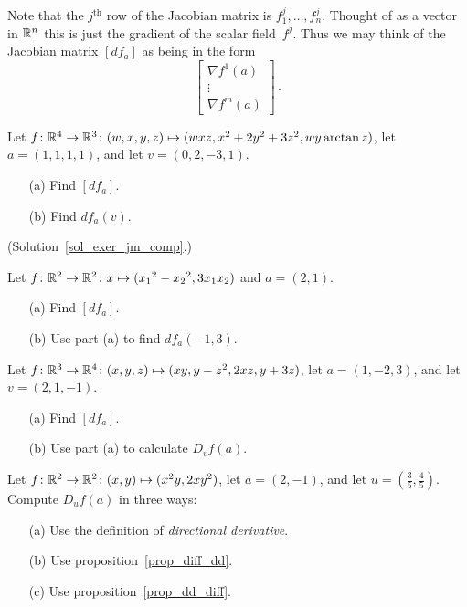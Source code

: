 Note that the $j^{\text{th}}$ row of the Jacobian matrix is $f_1^j, \dots, f_n^j$.  Thought of
as a vector in $\mathbb{R}^n$ this is just the gradient of the scalar field~$f^j$.  Thus we may think
of the Jacobian matrix $[df_a]$ as being in the form
  \[ \begin{bmatrix}   \nabla f^1(a)  \\
                         \vdots       \\
                       \nabla f^m(a)
     \end{bmatrix}\,. \]

\begin{exer}\label{exer_jm_comp}  Let $f\colon \mathbb{R}^4 \rightarrow \mathbb{R}^3\colon  (w,x,y,z) \mapsto
(wxz, x^2 + 2y^2 + 3z^2, wy\arctan z)$, let $a = (1,1,1,1)$, and let $v = (0,2,-3,1)$.
 \begin{enumerate}
  \item[(a)] Find $[df_a]$.
  \item[(b)] Find $df_a(v)$.
 \end{enumerate}
(Solution~\ref{sol_exer_jm_comp}.)
\end{exer}

\begin{prob} Let $f \colon \mathbb{R}^2 \rightarrow \mathbb{R}^2\colon  x \mapsto ({x_1}^2 - {x_2}^2, 3x_1x_2)$ and
$a = (2,1)$.
 \begin{enumerate}
  \item[(a)] Find $[df_a]$.
  \item[(b)] Use part (a) to find $df_a(-1,3)$.
 \end{enumerate}
\end{prob}

\begin{prob}  Let $f \colon \mathbb{R}^3 \rightarrow \mathbb{R}^4 \colon (x,y,z) \mapsto (xy, y - z^2, 2xz, y + 3z)$,
let $a = (1,-2,3)$, and let $v = (2,1,-1)$.
 \begin{enumerate}
  \item[(a)] Find $[df_a]$.
  \item[(b)] Use part (a) to calculate $D_vf(a)$.
 \end{enumerate}
\end{prob}

\begin{prob}  Let $f \colon \mathbb{R}^2 \rightarrow \mathbb{R}^2 \colon (x,y) \mapsto (x^2y, 2xy^2)$, let $a = (2,-1)$,
and let $u = (\frac35, \frac45)$.  Compute $D_uf(a)$ in three ways:
 \begin{enumerate}
  \item[(a)] Use the definition of \emph{directional derivative}.
  \item[(b)] Use proposition~\ref{prop_diff_dd}.
  \item[(c)] Use proposition~\ref{prop_dd_diff}.
 \end{enumerate}
\end{prob}


